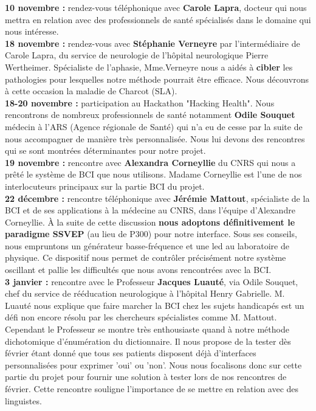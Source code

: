 \documentclass[11pt,a4paper]{article}
\theoremstyle{plain}
\theoremstyle{definition}
\begin{document}
\textbf{10 novembre : } rendez-vous téléphonique avec \textbf{Carole Lapra}, docteur qui nous mettra en relation avec des professionnels de santé spécialisés dans le domaine qui nous intéresse. \\

\textbf{18 novembre : } rendez-vous avec \textbf{Stéphanie Verneyre} par l'intermédiaire de Carole Lapra, du service de neurologie de l'hôpital neurologique Pierre Wertheimer. Spécialiste de l'aphasie, Mme.Verneyre nous a aidés à \textbf{cibler} les pathologies pour lesquelles notre méthode pourrait être efficace. Nous découvrons à cette occasion la maladie de Charcot (SLA). \\

\textbf{18-20 novembre : } participation au Hackathon "Hacking Health". Nous rencontrons de nombreux professionnels de santé notamment \textbf{Odile Souquet} médecin à l'ARS (Agence régionale de Santé) qui n'a eu de cesse par la suite de nous accompagner de manière très personnalisée. Nous lui devons des rencontres qui se sont montrées déterminantes pour notre projet. \\

\textbf{19 novembre : } rencontre avec \textbf{Alexandra Corneyllie} du CNRS qui nous a prêté le système de BCI que nous utilisons. Madame Corneyllie est l'une de nos interlocuteurs principaux sur la partie BCI du projet. \\

\textbf{22 décembre : } rencontre téléphonique avec \textbf{Jérémie Mattout}, spécialiste de la BCI et de ses applications à la médecine au CNRS, dans l'équipe d'Alexandre Corneyllie. À la suite de cette discussion \textbf{nous adoptons définitivement le paradigme SSVEP} (au lieu de P300) pour notre interface. Sous ses conseils, nous empruntons un générateur basse-fréquence et une led au laboratoire de physique. Ce dispositif nous permet de contrôler précisément notre système oscillant et pallie les difficultés que nous avons rencontrées avec la BCI. \\

\textbf{3 janvier : } rencontre avec le Professeur \textbf{Jacques Luauté}, via Odile Souquet, chef du service de rééducation neurologique à l'hôpital Henry Gabrielle. M. Luauté nous explique que faire marcher la BCI chez les sujets handicapés est un défi non encore résolu par les chercheurs spécialistes comme M. Mattout. Cependant le Professeur se montre très enthousiaste quand à notre méthode dichotomique d'énumération du dictionnaire. Il nous propose de la tester dès février étant donné que tous ses patients disposent déjà d'interfaces personnalisées pour exprimer 'oui' ou 'non'. Nous nous focalisons donc sur cette partie du projet pour fournir une solution à tester lors de nos rencontres de février. Cette rencontre souligne l'importance de se mettre en relation avec des linguistes. \\
\end{document}
